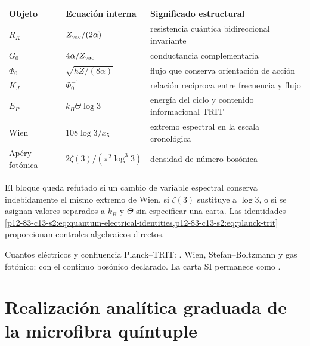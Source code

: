\begin{longtable}{@{}p{}p{}p{}@{}}
\toprule
Objeto & Ecuaci\'on interna & Significado estructural\\
\midrule
\endhead
\(R_K\) & \(Z_{\rm vac}/(2\alpha)\) & resistencia cu\'antica bidireccional invariante\\
\(G_0\) & \(4\alpha/Z_{\rm vac}\) & conductancia complementaria\\
\(\Phi_0\) & \(\sqrt{hZ/(8\alpha)}\) & flujo que conserva orientaci\'on de acci\'on\\
\(K_J\) & \(\Phi_0^{-1}\) & relaci\'on rec\'iproca entre frecuencia y flujo\\
\(E_P\) & \(k_B\Theta\log3\) & energ\'ia del ciclo y contenido informacional TRIT\\
Wien & \(108\log3/x_5\) & extremo espectral en la escala cronol\'ogica\\
Ap\'ery fot\'onica & \(2\zeta(3)/(\pi^2\log^3 3)\) & densidad de n\'umero bos\'onica\\
\bottomrule
\end{longtable}

\begin{falsifier}
El bloque queda refutado si un cambio de variable espectral conserva
indebidamente el mismo extremo de Wien, si \(\zeta(3)\) sustituye a
\(\log3\), o si se asignan valores separados a \(k_B\) y \(\Theta\) sin
especificar una carta. Las identidades
\cref{p12-83-c13-s2:eq:quantum-electrical-identities,p12-83-c13-s2:eq:planck-trit} proporcionan controles
algebraicos directos.
\end{falsifier}

\begin{statusbox}
Cuantos el\'ectricos y confluencia Planck--TRIT: . Wien, Stefan--Boltzmann y gas fot\'onico:  con el continuo bos\'onico declarado. La carta SI permanece como .
\end{statusbox}


\section{Realización analítica graduada de la microfibra quíntuple}
\label{p12-83-c13-s3:chap:realizacion-analitica-contraangulo}

